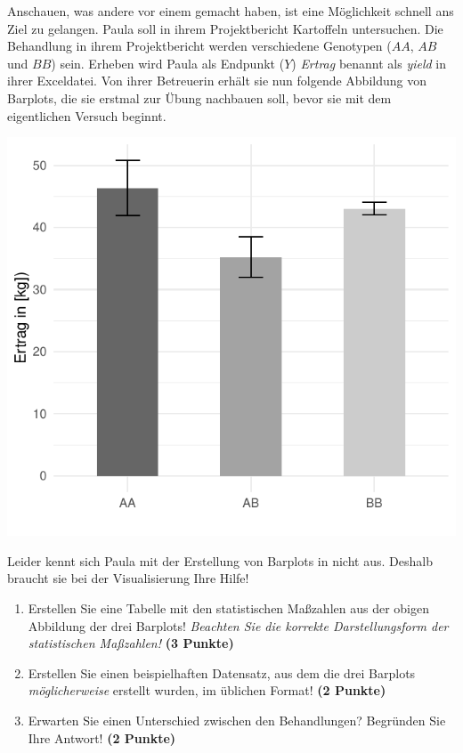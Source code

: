 \documentclass[a4paper, 9pt]{scrartcl}\usepackage[]{graphicx}\usepackage[]{xcolor}
\makeatletter
\def\maxwidth{ %
  \ifdim\Gin@nat@width>\linewidth
    \linewidth
  \else
    \Gin@nat@width
  \fi
}
\makeatother
\begin{document}
Anschauen, was andere vor einem gemacht haben, ist eine Möglichkeit schnell ans Ziel zu gelangen. Paula soll in ihrem Projektbericht Kartoffeln untersuchen. Die Behandlung in ihrem Projektbericht werden verschiedene Genotypen ($AA$, $AB$ und $BB$) sein. Erheben wird Paula als Endpunkt ($Y$) \textit{Ertrag} benannt als \textit{yield} in ihrer Exceldatei. Von ihrer Betreuerin erhält sie nun folgende Abbildung von Barplots, die sie erstmal zur Übung nachbauen soll, bevor sie mit dem eigentlichen Versuch beginnt.



{\centering \includegraphics[width=\maxwidth]{img/barplot-02-1} 

}




Leider kennt sich Paula mit der Erstellung von Barplots in \Rlogo nicht aus. Deshalb braucht sie bei der Visualisierung Ihre Hilfe!

\begin{enumerate}
\item Erstellen Sie eine Tabelle mit den statistischen Maßzahlen aus der
  obigen Abbildung der drei Barplots! \textit{Beachten Sie die korrekte
    Darstellungsform der statistischen Maßzahlen!} \textbf{(3 Punkte)}
\item Erstellen Sie einen beispielhaften Datensatz, aus dem die drei
  Barplots \textit{möglicherweise} erstellt wurden, im \Rlogo üblichen Format! \textbf{(2 Punkte)}
\item Erwarten Sie einen Unterschied zwischen den Behandlungen? Begründen
  Sie Ihre Antwort! \textbf{(2 Punkte)}
\end{enumerate} 
\clearpage
\end{document}
